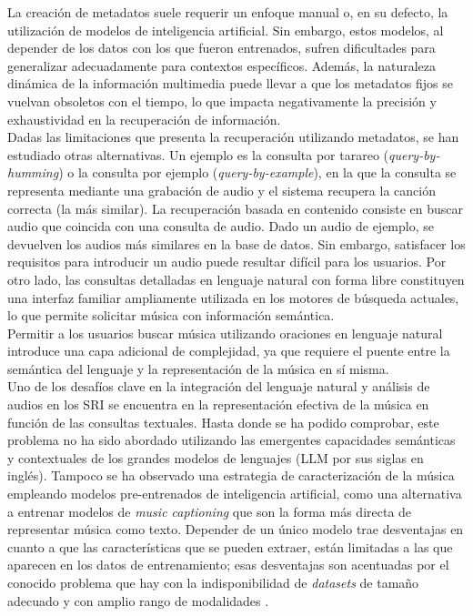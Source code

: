 La creación de metadatos suele requerir un enfoque manual o, en su defecto, la utilización de modelos de inteligencia artificial. Sin embargo, estos modelos, al depender de los datos con los que fueron entrenados, sufren dificultades para generalizar adecuadamente para contextos específicos. Además, la naturaleza dinámica de la información multimedia puede llevar a que los metadatos fijos se vuelvan obsoletos con el tiempo, lo que impacta negativamente la precisión y exhaustividad en la recuperación de información. \\ %
Dadas las limitaciones que presenta la recuperación utilizando metadatos, se han estudiado otras alternativas. Un ejemplo es la consulta por tarareo (\textit{query-by-humming}) o la consulta por ejemplo (\textit{query-by-example}), en la que la consulta se representa mediante una grabación de audio y el sistema recupera la canción correcta (la más similar). La recuperación basada en contenido consiste en buscar audio que coincida con una consulta de audio. Dado un audio de ejemplo, se devuelven los audios más similares en la base de datos. Sin embargo, satisfacer los requisitos para introducir un audio puede resultar difícil para los usuarios. Por otro lado, las consultas detalladas en lenguaje natural con forma libre constituyen una interfaz familiar ampliamente utilizada en los motores de búsqueda actuales, lo que permite solicitar música con información semántica.\\
Permitir a los usuarios buscar música utilizando oraciones en lenguaje natural introduce una capa adicional de complejidad, ya que requiere el puente entre la semántica del lenguaje y la representación de la música en sí misma.\\
Uno de los desafíos clave en la integración del lenguaje natural y análisis de audios en los SRI se encuentra en la representación efectiva de la música en función de las consultas textuales. Hasta donde se ha podido comprobar, este problema no ha sido abordado utilizando las emergentes capacidades semánticas y contextuales de los grandes modelos de lenguajes (LLM por sus siglas en inglés). Tampoco se ha observado una estrategia de caracterización de la música empleando modelos pre-entrenados de inteligencia artificial, como una alternativa a entrenar modelos de \textit{music captioning} que son la forma más directa de representar música como texto. Depender de un único modelo trae desventajas en cuanto a que las características que se pueden extraer, están limitadas a las que aparecen en los datos de entrenamiento; esas desventajas son acentuadas por el conocido problema que hay con la indisponibilidad de \textit{datasets} de tamaño adecuado y con amplio rango de modalidades \cite{Simonetta2019MultimodalMI}. \\

